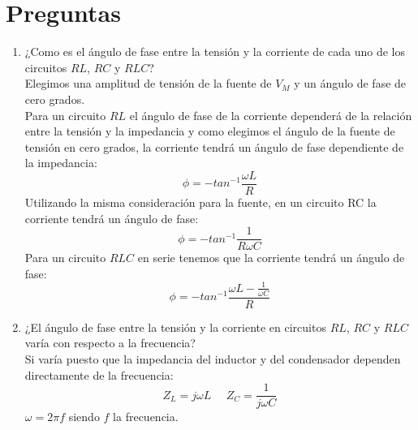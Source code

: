 \documentclass[twocolumn]{IEEEtran}
\begin{document}
\section{Preguntas}
\begin{enumerate}
 \item ¿Como es el ángulo de fase entre la tensión y la corriente de cada uno de los circuitos $RL$, $RC$ y $RLC$?\\
Elegimos una amplitud de tensión de la fuente de $V_M$ y un ángulo de fase de cero grados.\\
Para un circuito $RL$ el ángulo de fase de la corriente dependerá de la relación entre la tensión y la impedancia y como elegimos el ángulo de la fuente de tensión en cero grados, la corriente tendrá un ángulo de fase dependiente de la impedancia:
\begin{equation}
 \phi = -tan^{-1} \frac{\omega L}{R}
\label{ecu11}
\end{equation}
Utilizando la misma consideración para la fuente, en un circuito RC la corriente tendrá un ángulo de fase:
\begin{equation}
 \phi  =  - ta{n^{ - 1}}\frac{1}{{R\omega C}}
\label{ecu12}
\end{equation}
Para un circuito $RLC$ en serie tenemos que la corriente tendrá un ángulo de fase:
\begin{equation}
 \phi  =  - ta{n^{ - 1}}\frac{{\omega L - \frac{1}{{\omega C}}}}{R}
\label{ecu13}
\end{equation}

 \item ¿El ángulo de fase entre la tensión y la corriente en circuitos $RL$, $RC$ y $RLC$ varía con respecto a la frecuencia?\\
Si varía puesto que la impedancia del inductor y del condensador dependen directamente de la frecuencia:
\begin{equation}
 {Z_L} = j\omega L \ \ \ \ \ \ {Z_C} = \frac{1}{{j\omega C}}
\label{ecu14}
\end{equation}
\noindent
$\omega=2 \pi f$ siendo $f$ la frecuencia.


\end{enumerate}
\end{document}
